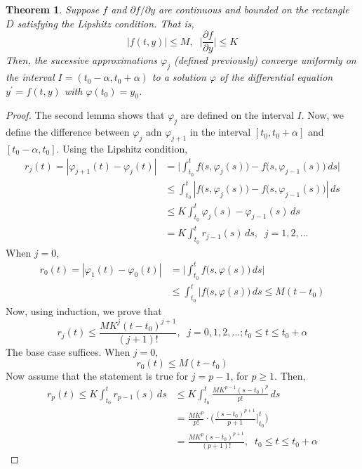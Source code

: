 \documentclass{article}
\newtheorem{theorem}{Theorem}[section]
\theoremstyle{remark}
\theoremstyle{definition}
\begin{document}
    \begin{theorem}
    Suppose $f$ and $\partial f/\partial y$ are continuous and bounded on the rectangle $D$ satisfying the Lipshitz condition. That is, 
    \[|f(t, y)| \leq M, \;\; \Big| \frac{\partial f}{\partial y} \Big| \leq K\]
    Then, the sucessive approximations $\varphi_j$ (defined previously) converge uniformly on the interval $I = (t_0 - \alpha, t_0 + \alpha)$ to a solution $\varphi$ of the differential equation $y^\prime = f(t, y)$ with $\varphi(t_0) = y_0$. 
    \end{theorem}
    \begin{proof}
    The second lemma shows that $\varphi_j$ are defined on the interval $I$. Now, we define the difference between $\varphi_j$ adn $\varphi_{j+1}$ in the interval $[t_0, t_0 + \alpha]$ and $[t_0 - \alpha, t_0]$. Using the Lipshitz condition, 
    \begin{align*}
        r_j (t) = |\varphi_{j+1} (t) - \varphi_j (t)| & = \bigg| \int_{t_0}^t f\big(s, \varphi_j (s)\big) - f\big(s, \varphi_{j-1} (s) \big) \,ds\bigg| \\
        & \leq \int_{t_0}^t |f\big(s, \varphi_j (s)\big) - f\big( s, \varphi_{j-1} (s)\big)|\,ds \\
        & \leq K \int_{t_0}^t \varphi_j (s) - \varphi_{j-1} (s) \,ds \\
        & = K \int_{t_0}^t r_{j-1} (s) \,ds, \;\; j = 1, 2, ...
    \end{align*}
    When $j=0$, 
    \begin{align*}
        r_0 (t) = |\varphi_1 (t) - \varphi_0 (t)| & = \bigg| \int_{t_0}^t f \big(s, \varphi(s)\big) \,ds \bigg| \\
        & \leq \int_{t_0}^t |f\big(s, \varphi(s)\big)\,ds \leq M (t - t_0) 
    \end{align*}
    Now, using induction, we prove that 
    \[r_j (t) \leq \frac{M K^j (t-t_0)^{j+1}}{(j+1)!}, \;\; j = 0, 1, 2, ...; t_0 \leq t \leq t_0 + \alpha\]
    The base case suffices. When $j=0$, 
    \[r_0 (t) \leq M (t-t_0)\]
    Now assume that the statement is true for $j=p-1$, for $p \geq 1$. Then, 
    \begin{align*}
        r_p (t) \leq K \int_{t_0}^t r_{p-1} (s) \, ds & \leq K \int_{t_0}^t \frac{M K^{p-1} (s - t_0)^p}{p!} \,ds \\
        & = \frac{M K^p}{p!} \cdot \bigg( \frac{(s-t_0)^{p+1}}{p+1} \bigg|_{t_0}^t \bigg) \\
        & = \frac{M K^p (s - t_0)^{p+1}}{(p+1)!}, \;\; t_0 \leq t \leq t_0 + \alpha
    \end{align*}
    \end{proof}
\end{document}
